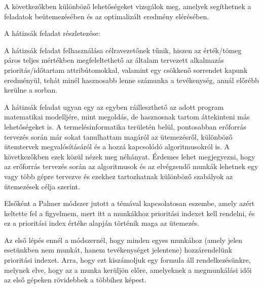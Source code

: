 A következőkben különböző lehetőségeket vizsgálok meg, amelyek segíthetnek a feladatok beütemezésében és az optimalizált eredmény elérésében.


A hátizsák feladat részletezése:



A hátizsák feladat felhasználása célravezetőnek tűnik, hiszen az érték/tömeg páros teljes mértékben megfeleltethető az általam tervezett alkalmazás prioritás/időtartam attribútomokkal, valamint egy csökkenő sorrendet kapunk eredményül, tehát minél hasznosabb lenne számunka a tevékenység, annál előrébb kerülne a sorban.




A hátizsák feladat ugyan egy az egyben ráilleszthető az adott program matematikai modelljére, mint megoldás, de hasznosnak tartom áttekinteni más lehetőségeket is. A termelésinformatika területén belül, pontosabban erőforrás tervezés során már sokat tanulhattam magáról az ütemezésről, különböző ütemtervek megvalósításáról és a hozzá kapcsolódó algoritmusokról is. A következőkben ezek közül nézek meg néhányat. Érdemes lehet megjegyezni, hogy az erőforrás tervezés során az algoritmusok és az elvégzendő munkák lehetnek egy vagy több gépre tervezve és ezekhez tartozhatnak különböző szabályok az ütemezések célja szerint.



Elsőként a Palmer módszer jutott a témával kapcsolatosan eszembe, amely azért keltette fel a figyelmem, mert itt a munkákhoz prioritási indexet kell rendelni, és ez a prioritási index értéke alapján történik maga az ütemezés.

Az első lépés ennél a módszernél, hogy minden egyes munkához (amely jelen esetünkben nem munkát, hanem tevékenységet jelentene) hozzárendelünk prioritási indexet. Arra, hogy ezt kiszámoljuk egy formula áll rendelkezésünkre, melynek elve, hogy az a munka kerüljön előre, amelyeknek a megmunkálási idői az első gépeken rövidebbek a többihez képest.

